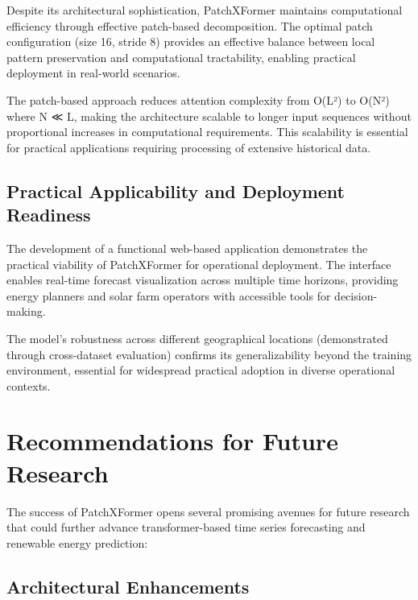 \documentclass[12pt]{uomthesis}
\begin{document}
Despite its architectural sophistication, PatchXFormer maintains computational efficiency through effective patch-based decomposition. The optimal patch configuration (size 16, stride 8) provides an effective balance between local pattern preservation and computational tractability, enabling practical deployment in real-world scenarios.

The patch-based approach reduces attention complexity from O(L²) to O(N²) where N ≪ L, making the architecture scalable to longer input sequences without proportional increases in computational requirements. This scalability is essential for practical applications requiring processing of extensive historical data.

\subsection{Practical Applicability and Deployment Readiness}

The development of a functional web-based application demonstrates the practical viability of PatchXFormer for operational deployment. The interface enables real-time forecast visualization across multiple time horizons, providing energy planners and solar farm operators with accessible tools for decision-making.

The model's robustness across different geographical locations (demonstrated through cross-dataset evaluation) confirms its generalizability beyond the training environment, essential for widespread practical adoption in diverse operational contexts.

\section{Recommendations for Future Research}

The success of PatchXFormer opens several promising avenues for future research that could further advance transformer-based time series forecasting and renewable energy prediction:

\subsection{Architectural Enhancements}
\end{document}

